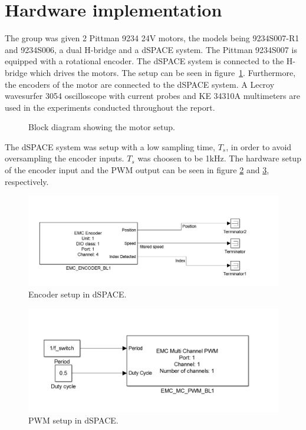 \section{Hardware implementation}
The group was given 2 Pittman 9234 24V motors, the models being 9234S007-R1 and 9234S006, a dual H-bridge and a dSPACE system.
The Pittman 9234S007 is equipped with a rotational encoder.
The dSPACE system is connected to the H-bridge which drives the motors. 
The setup can be seen in figure~\ref{fig:implementation_block}.
Furthermore, the encoders of the motor are connected to the dSPACE system.
A Lecroy wavesurfer 3054 oscilloscope with current probes and KE 34310A multimeters are used in the experiments conducted throughout the report.

\begin{figure}[!h]
\centering

  \caption{Block diagram showing the motor setup.}
  \label{fig:implementation_block}
\end{figure}

The dSPACE system was setup with a low sampling time, $T_s$, in order to avoid oversampling the encoder inputs.
$T_s$ was choosen to be 1kHz. 
The hardware setup of the encoder input and the PWM output can be seen in figure \ref{fig:encoder} and \ref{fig:pwm}, respectively.


\begin{figure}[!h]
\centering
\includegraphics[scale=0.3]{graphics/encoder.png}
  \caption{Encoder setup in dSPACE.}
  \label{fig:encoder}
\end{figure}

\begin{figure}[!h]
\centering
\includegraphics[scale=0.3]{graphics/pwm.png}
  \caption{PWM setup in dSPACE.}
  \label{fig:pwm}
\end{figure}

